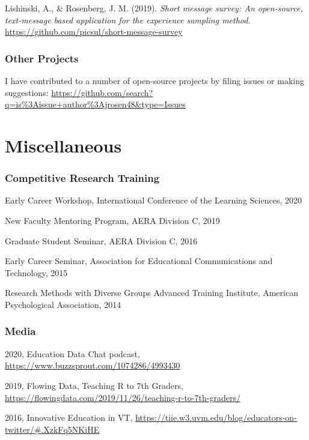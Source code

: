 \documentclass[
  14,
]{article}
\begin{document}
Lishinski, A., \& Rosenberg, J. M. (2019). \emph{Short message survey:
An open-source, text-message based application for the experience
sampling method.} \url{https://github.com/picsul/short-message-survey}

\hypertarget{other-projects}{%
\subsubsection{Other Projects}\label{other-projects}}

I have contributed to a number of open-source projects by filing issues
or making suggestions:
\url{https://github.com/search?q=is\%3Aissue+author\%3Ajrosen48\&type=Issues}

\hypertarget{miscellaneous}{%
\section{Miscellaneous}\label{miscellaneous}}

\hypertarget{competitive-research-training}{%
\subsubsection{Competitive Research
Training}\label{competitive-research-training}}

Early Career Workshop, International Conference of the Learning
Sciences, 2020

New Faculty Mentoring Program, AERA Division C, 2019

Graduate Student Seminar, AERA Division C, 2016

Early Career Seminar, Association for Educational Communications and
Technology, 2015

Research Methods with Diverse Groups Advanced Training Institute,
American Psychological Association, 2014

\hypertarget{media}{%
\subsubsection{Media}\label{media}}

2020, Education Data Chat podcast,
\url{https://www.buzzsprout.com/1074286/4993430}

2019, Flowing Data, Teaching R to 7th Graders,
\url{https://flowingdata.com/2019/11/26/teaching-r-to-7th-graders/}

2016, Innovative Education in VT,
\url{https://tiie.w3.uvm.edu/blog/educators-on-twitter/\#.XzkFq5NKiHE}
\end{document}
